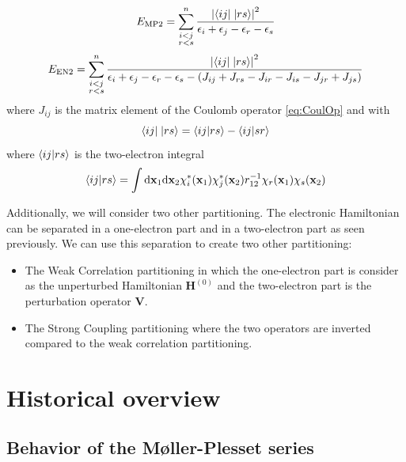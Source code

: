 \documentclass[11pt,a4paper]{article}
\newcommand{\bH}{\mathbf{H}}
\newcommand{\bV}{\mathbf{V}}
\begin{document}
\begin{equation}\label{eq:EMP2}
E_{\text{MP2}}=\sum\limits_{\substack{i<j \\ r<s}}^{n}\frac{\abs{\bra{ij}\hspace{1pt}\ket{rs}}^2}{\epsilon_i + \epsilon_j - \epsilon_r - \epsilon_s}
\end{equation}
\begin{equation}\label{eq:EEN2}
E_{\text{EN2}}=\sum\limits_{\substack{i<j \\ r<s}}^{n}\frac{\abs{\bra{ij}\hspace{1pt}\ket{rs}}^2}{\epsilon_i + \epsilon_j - \epsilon_r - \epsilon_s - (J_{ij} + J_{rs} - J_{ir} - J_{is} - J_{jr} + J_{js})}
\end{equation}
where $J_{ij}$ is the matrix element of the Coulomb operator \eqref{eq:CoulOp} and with
\begin{equation}
\bra{ij}\hspace{1pt}\ket{rs}=\bra{ij}\ket{rs} - \bra{ij}\ket{sr}
\end{equation}
where $\bra{ij}\ket{rs}$ is the two-electron integral
\begin{equation}
\bra{ij}\ket{rs}=\int \dd\vb{x}_1\dd\vb{x}_2\chi_i^*(\vb{x}_1)\chi_j^*(\vb{x}_2)r_{12}^{-1}\chi_r(\vb{x}_1)\chi_s(\vb{x}_2)
\end{equation}

Additionally, we will consider two other partitioning. The electronic Hamiltonian can be separated in a one-electron part and in a two-electron part as seen previously. We can use this separation to create two other partitioning:

\begin{itemize}
\item The Weak Correlation partitioning in which the one-electron part is consider as the unperturbed Hamiltonian $\bH^{(0)}$ and the two-electron part is the perturbation operator $\bV$.
\item The Strong Coupling partitioning where the two operators are inverted compared to the weak correlation partitioning.
\end{itemize}

\section{Historical overview}

\subsection{Behavior of the M{\o}ller-Plesset series}
\end{document}
